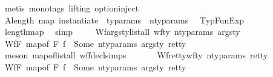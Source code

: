 \begin{isabellebody}
\ {\isacharparenleft}{\kern0pt}metis\ {\isacharparenleft}{\kern0pt}mono{\isacharunderscore}{\kern0pt}tags{\isacharcomma}{\kern0pt}\ lifting{\isacharparenright}{\kern0pt}\ option{\isachardot}{\kern0pt}inject{\isacharparenright}{\kern0pt}\isanewline
\ \ \isamarkupfalse%
\ A{}{\isacharcolon}{\kern0pt}{\isachardoublequoteopen}length\ {\isacharparenleft}{\kern0pt}map\ {\isacharparenleft}{\kern0pt}instantiate\ {\isasymOmega}{\isacharparenright}{\kern0pt}\ ty{\isacharunderscore}{\kern0pt}params{\isacharparenright}{\kern0pt}\ {\isacharequal}{\kern0pt}\ n{\isacharunderscore}{\kern0pt}ty{\isacharunderscore}{\kern0pt}params{\isachardoublequoteclose}\ \isamarkupfalse%
\ TypFunExp\isanewline
\ \ \ \ \isamarkupfalse%
\ length{\isacharunderscore}{\kern0pt}map\ \isamarkupfalse%
\ simp\ \isanewline
\ \ \isamarkupfalse%
\ Wf{\isacharunderscore}{\kern0pt}args{\isacharunderscore}{\kern0pt}ty{\isacharcolon}{\kern0pt}{\isachardoublequoteopen}list{\isacharunderscore}{\kern0pt}all\ {\isacharparenleft}{\kern0pt}wf{\isacharunderscore}{\kern0pt}ty\ n{\isacharunderscore}{\kern0pt}ty{\isacharunderscore}{\kern0pt}params{\isacharparenright}{\kern0pt}\ args{\isacharunderscore}{\kern0pt}ty{\isachardoublequoteclose}\ \isamarkupfalse%
\ Wf{\isacharunderscore}{\kern0pt}F\ {\isacartoucheopen}map{\isacharunderscore}{\kern0pt}of\ F\ f\ {\isacharequal}{\kern0pt}\ Some\ {\isacharparenleft}{\kern0pt}n{\isacharunderscore}{\kern0pt}ty{\isacharunderscore}{\kern0pt}params{\isacharcomma}{\kern0pt}\ args{\isacharunderscore}{\kern0pt}ty{\isacharcomma}{\kern0pt}\ ret{\isacharunderscore}{\kern0pt}ty{\isacharparenright}{\kern0pt}{\isacartoucheclose}\isanewline
\ \ \ \ \isamarkupfalse%
\ {\isacharparenleft}{\kern0pt}meson\ map{\isacharunderscore}{\kern0pt}of{\isacharunderscore}{\kern0pt}list{\isacharunderscore}{\kern0pt}all\ wf{\isacharunderscore}{\kern0pt}fdecl{\isachardot}{\kern0pt}simps{\isacharparenright}{\kern0pt}\ \ \ \isanewline
\ \ \isamarkupfalse%
\ Wf{\isacharunderscore}{\kern0pt}ret{\isacharunderscore}{\kern0pt}ty{\isacharcolon}{\kern0pt}{\isachardoublequoteopen}wf{\isacharunderscore}{\kern0pt}ty\ n{\isacharunderscore}{\kern0pt}ty{\isacharunderscore}{\kern0pt}params\ ret{\isacharunderscore}{\kern0pt}ty{\isachardoublequoteclose}\ \isamarkupfalse%
\ Wf{\isacharunderscore}{\kern0pt}F\ {\isacartoucheopen}map{\isacharunderscore}{\kern0pt}of\ F\ f\ {\isacharequal}{\kern0pt}\ Some\ {\isacharparenleft}{\kern0pt}n{\isacharunderscore}{\kern0pt}ty{\isacharunderscore}{\kern0pt}params{\isacharcomma}{\kern0pt}\ args{\isacharunderscore}{\kern0pt}ty{\isacharcomma}{\kern0pt}\ ret{\isacharunderscore}{\kern0pt}ty{\isacharparenright}{\kern0pt}{\isacartoucheclose}\isanewline

\end{isabellebody}
